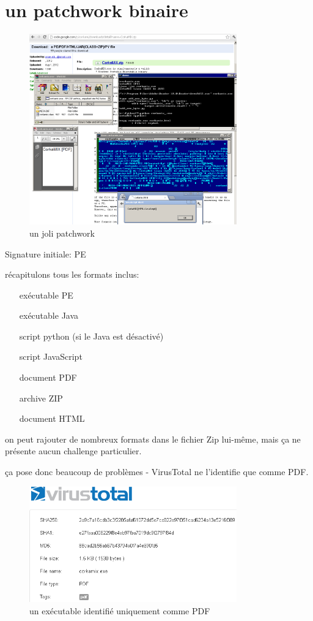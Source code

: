\section{un patchwork binaire}
\begin{figure}[ht]
  \centering
  \includegraphics[width=0.8\textwidth]{albertini/img/corkamix}
  \caption{un joli patchwork}
  \label{fig:albertini:corkamix}
\end{figure}

Signature initiale: PE

récapitulons tous les formats inclus:
\begin{itemize}
\item[exécutable] PE
\item[exécutable] Java
\item[script] python (si le Java est désactivé)
\item[script] JavaScript
\item[document] PDF
\item[archive] ZIP
\item[document] HTML
\end{itemize}

on peut rajouter de nombreux formats dans le fichier Zip lui-même, mais ça ne présente aucun challenge particulier.

ça pose donc beaucoup de problèmes - VirusTotal ne l'identifie que comme PDF.
\begin{figure}[ht]
  \centering
  \includegraphics[width=0.8\textwidth]{albertini/img/corkamix-vt}
  \caption{un exécutable identifié uniquement comme PDF}
  \label{fig:albertini:corkamix-vt}
\end{figure}



